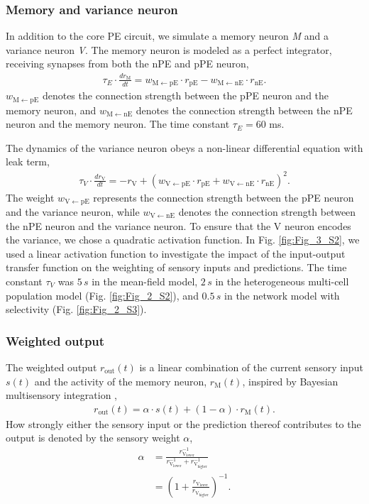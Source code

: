 \documentclass[10pt,a4paper]{article}
\begin{document}
\subsubsection{Memory and variance neuron}
%
In addition to the core PE circuit, we simulate a memory neuron \textit{M} and a variance neuron \textit{V}. The memory neuron is modeled as a perfect integrator, receiving synapses from both the nPE and pPE neuron,
%
\begin{align}
\tau_E \cdot \frac{dr_\mathrm{M}}{dt} = w_\mathrm{M\leftarrow pE} \cdot r_\mathrm{pE} - w_\mathrm{M\leftarrow nE} \cdot r_\mathrm{nE}.
\end{align}
%
$w_\mathrm{M\leftarrow pE}$ denotes the connection strength between the pPE neuron and the memory neuron, and  $w_\mathrm{M\leftarrow nE}$ denotes the connection strength between the nPE neuron and the memory neuron. The time constant $\tau_E = 60$ ms.

The dynamics of the variance neuron obeys a non-linear differential equation with leak term,
%
\begin{align}
\tau_V \cdot \frac{dr_\mathrm{V}}{dt} = -r_\mathrm{V} + (w_\mathrm{V\leftarrow pE} \cdot r_\mathrm{pE} + w_\mathrm{V\leftarrow nE} \cdot r_\mathrm{nE})^2.
\end{align}
%
The weight $w_\mathrm{V\leftarrow pE}$ represents the connection strength between the pPE neuron and the variance neuron, while  $w_\mathrm{V\leftarrow nE}$ denotes the connection strength between the nPE neuron and the variance neuron. To ensure that the V neuron encodes the variance, we chose a quadratic activation function. In Fig. \ref{fig:Fig_3_S2}, we used a linear activation function to investigate the impact of the input-output transfer function on the weighting of sensory inputs and predictions. The time constant $\tau_V$ was $5\,s$ in the mean-field model, $2\,s$ in the heterogeneous multi-cell population model (Fig. \ref{fig:Fig_2_S2}), and $0.5\,s$ in the network model with selectivity (Fig. \ref{fig:Fig_2_S3}).

\subsubsection{Weighted output}
%
The weighted output $r_\mathrm{out}(t) $ is a linear combination of the current sensory input $s(t)$ and the activity of the memory neuron, $r_\mathrm{M}(t)$, inspired by Bayesian multisensory integration \citep[see, e.g.][]{pouget2013probabilistic},
%
\begin{align}
r_\mathrm{out}(t) = \alpha \cdot s(t) + (1-\alpha) \cdot r_\mathrm{M}(t).
\end{align}
%
How strongly either the sensory input or the prediction thereof contributes to the output is denoted by the sensory weight $\alpha$,
%
\begin{align}
\alpha &= \frac{r_\mathrm{V_{lower}}^{-1}}{r_\mathrm{V_{lower}}^{-1} + r_\mathrm{V_{higher}}^{-1}}\nonumber\\
& = \left( 1 + \frac{r_\mathrm{V_{lower}}}{r_\mathrm{V_{higher}}} \right)^{-1}.
\end{align}
\end{document}
